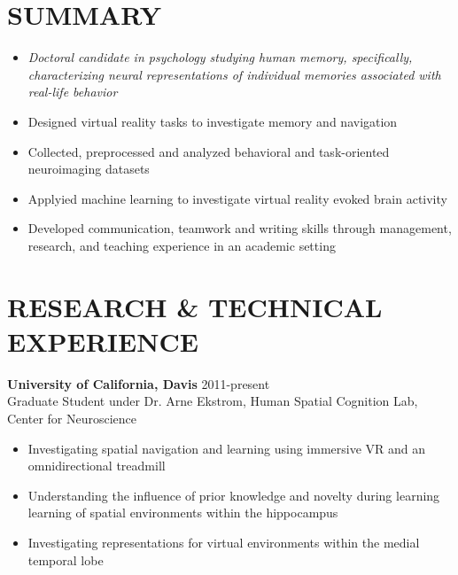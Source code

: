 \documentclass[line,margin,10pt]{res}
\begin{document}
\address{(919) 260 1824}
\address {jdstokes@ucdavis.edu}

\begin{resume}

\section{SUMMARY} 
\begin{itemize} \itemsep -2pt
\item  []{\sl Doctoral candidate in psychology studying human memory, specifically, characterizing neural representations of individual memories associated with real-life behavior}\\
\item Designed virtual reality tasks to investigate memory and navigation
\item Collected, preprocessed and analyzed behavioral and task-oriented neuroimaging datasets
\item Applyied machine learning to investigate virtual reality evoked brain activity
\item Developed communication, teamwork and writing skills through management, research, and teaching experience in an academic setting
\end{itemize}

\section{RESEARCH \& TECHNICAL EXPERIENCE} 
\textbf{University of California, Davis} \hfill 2011-present \\
Graduate Student under Dr. Arne Ekstrom, Human Spatial Cognition Lab, Center for Neuroscience
\begin{itemize} \itemsep -2pt
\item Investigating spatial navigation and learning using immersive VR and an omnidirectional treadmill
\item Understanding the influence of prior knowledge and novelty during learning learning of spatial environments within the hippocampus
\item Investigating representations for virtual environments within the medial temporal lobe
\end{itemize}


\end{resume}
\end{document}
